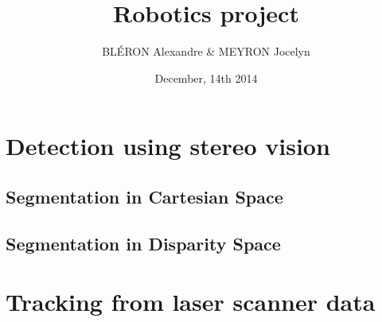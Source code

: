 \documentclass[a4paper,11pt]{article}
\title{Robotics project}
\author{BLÉRON Alexandre \& MEYRON Jocelyn}
\date{December, 14th 2014}
\begin{document}
\maketitle

\section{Detection using stereo vision}
\subsection{Segmentation in Cartesian Space}

\subsection{Segmentation in Disparity Space}

\section{Tracking from laser scanner data}
\end{document}
